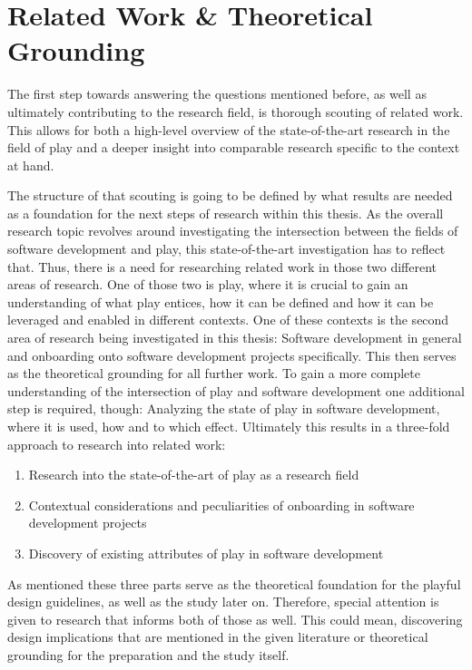 \section{Related Work \& Theoretical Grounding}

The first step towards answering the questions mentioned before, as well as ultimately contributing to the research field, is thorough scouting of related work. This allows for both a high-level overview of the state-of-the-art research in the field of play and a deeper insight into comparable research specific to the context at hand.

The structure of that scouting is going to be defined by what results are needed as a foundation for the next steps of research within this thesis. As the overall research topic revolves around investigating the intersection between the fields of software development and play, this state-of-the-art investigation has to reflect that. Thus, there is a need for researching related work in those two different areas of research. One of those two is play, where it is crucial to gain an understanding of what play entices, how it can be defined and how it can be leveraged and enabled in different contexts. One of these contexts is the second area of research being investigated in this thesis: Software development in general and onboarding onto software development projects specifically. This then serves as the theoretical grounding for all further work. To gain a more complete understanding of the intersection of play and software development one additional step is required, though: Analyzing the state of play in software development, where it is used, how and to which effect. Ultimately this results in a three-fold approach to research into related work:

\begin{enumerate}
  \item{Research into the state-of-the-art of play as a research field}
  \item{Contextual considerations and peculiarities of onboarding in software development projects}
  \item{Discovery of existing attributes of play in software development}
\end{enumerate}

As mentioned these three parts serve as the theoretical foundation for the playful design guidelines, as well as the study later on. Therefore, special attention is given to research that informs both of those as well. This could mean, discovering design implications that are mentioned in the given literature or theoretical grounding for the preparation and the study itself.

